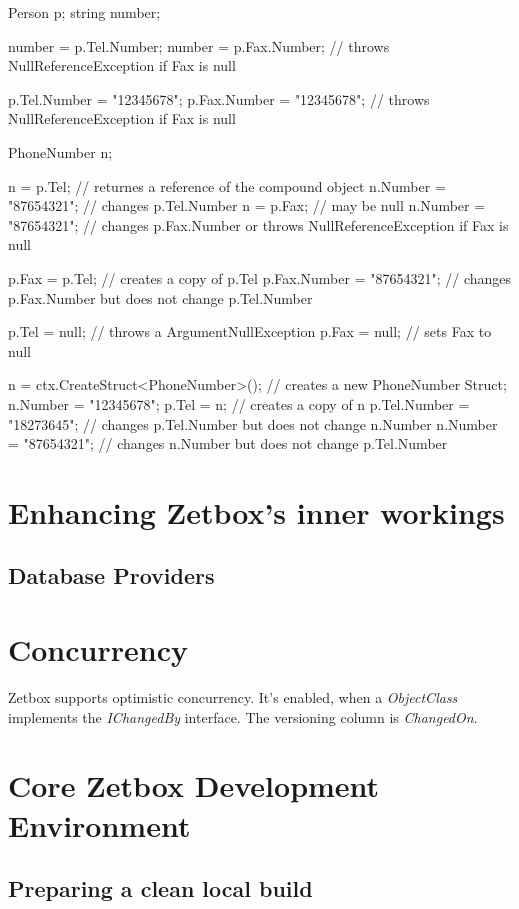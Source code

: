 \begin{CS}
Person p;
string number;

number = p.Tel.Number;
number = p.Fax.Number; // throws NullReferenceException if Fax is null

p.Tel.Number = "12345678";
p.Fax.Number = "12345678"; // throws NullReferenceException if Fax is null

PhoneNumber n;

n = p.Tel; // returnes a reference of the compound object
n.Number = "87654321"; // changes p.Tel.Number
n = p.Fax; // may be null
n.Number = "87654321"; // changes p.Fax.Number or throws NullReferenceException if Fax is null

p.Fax = p.Tel; // creates a copy of p.Tel
p.Fax.Number = "87654321"; // changes p.Fax.Number but does not change p.Tel.Number

p.Tel = null; // throws a ArgumentNullException
p.Fax = null; // sets Fax to null

n = ctx.CreateStruct<PhoneNumber>(); // creates a new PhoneNumber Struct;
n.Number = "12345678";
p.Tel = n; // creates a copy of n
p.Tel.Number = "18273645"; // changes p.Tel.Number but does not change n.Number
n.Number = "87654321"; // changes n.Number but does not change p.Tel.Number
\end{CS}

\section{Enhancing Zetbox's inner workings}

\subsection{Database Providers}




\section{Concurrency}
Zetbox supports optimistic concurrency. It's enabled, when a \emph{ObjectClass}
implements the \emph{IChangedBy} interface. The versioning column is
\emph{ChangedOn}.

\section{Core Zetbox Development Environment}

\subsection{Preparing a clean local build}

